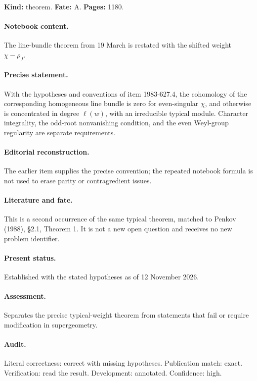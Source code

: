 \label{item:1983-628.1}

\noindent\textbf{Kind:} theorem. \textbf{Fate:} A. \textbf{Pages:} 1180.\par

\paragraph{Notebook content.} The line-bundle theorem from 19 March is restated with the shifted weight \(\chi-\rho_J\).

\paragraph{Precise statement.} With the hypotheses and conventions of item 1983-627.4, the cohomology of the corresponding homogeneous line bundle is zero for even-singular \(\chi\), and otherwise is concentrated in degree \(\ell(w)\), with an irreducible typical module. Character integrality, the odd-root nonvanishing condition, and the even Weyl-group regularity are separate requirements.

\paragraph{Editorial reconstruction.} The earlier item supplies the precise convention; the repeated notebook formula is not used to erase parity or contragredient issues.

\paragraph{Literature and fate.} This is a second occurrence of the same typical theorem, matched to Penkov (1988), \S2.1, Theorem 1. It is not a new open question and receives no new problem identifier.

\paragraph{Present status.} Established with the stated hypotheses as of 12 November 2026.

\paragraph{Assessment.} Separates the precise typical-weight theorem from statements that fail or require modification in supergeometry.

\paragraph{Audit.} Literal correctness: correct with missing hypotheses. Publication match: exact. Verification: read the result. Development: annotated. Confidence: high.

